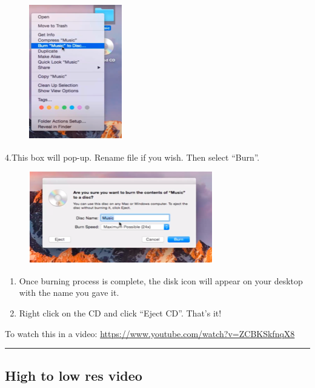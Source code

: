\documentclass[]{book}
\begin{document}
\begin{figure}
\centering
\includegraphics{images/lab_protocols/cd_burning/2.png}
\caption{}
\end{figure}

4.This box will pop-up. Rename file if you wish. Then select ``Burn''.

\begin{figure}
\centering
\includegraphics{images/lab_protocols/cd_burning/3.png}
\caption{}
\end{figure}

\begin{enumerate}
\def\labelenumi{\arabic{enumi}.}
\setcounter{enumi}{4}
\item
  Once burning process is complete, the disk icon will appear on your desktop with the name you gave it.
\item
  Right click on the CD and click ``Eject CD''. That's it!
\end{enumerate}

To watch this in a video: \url{https://www.youtube.com/watch?v=ZCBKSkfnqX8}

\begin{center}\rule{0.5\linewidth}{0.5pt}\end{center}

\hypertarget{high-to-low-res-video}{%
\subsection{High to low res video}\label{high-to-low-res-video}}
\end{document}
